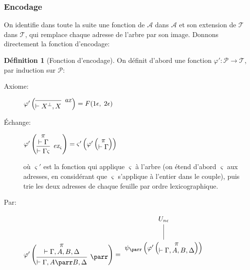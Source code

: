 \documentclass[11pt,a4paper]{article}
\theoremstyle{plain}
\theoremstyle{definition}
\newtheorem{definition}{Définition}
\theoremstyle{remark}
\newcommand*{\orth}{^\perp}
\newcommand*{\namedproofv}[2]{\hypo{#1}\infer[no rule]{1}{\vdash #2}}
\newcommand*{\axv}[1]{\infer{0}[\ensuremath{\mathit{ax}}]{\vdash #1}}
\newcommand*{\parrv}[1]{\infer{1}[\ensuremath{\parr}]{\vdash #1}}
\newcommand*{\permv}[2]{\infer{1}[\ensuremath{\textit{ex}_{#1}}]{\vdash #2}}
\newcommand*{\permapp}[2]{#2 #1}
\newcommand*{\someperm}{\varsigma}
\newcommand*{\sequent}{\Gamma}
\newcommand*{\sequentbis}{\Delta}
\newcommand*{\proofs}{\ensuremath{\mathcal{P}}}
\newcommand*{\addresses}{\ensuremath{\mathcal{A}}}
\newcommand*{\trees}{\ensuremath{\mathcal{T}}}
\newcommand*{\encode}{\ensuremath{\varphi}}
\begin{document}
\subsubsection{Encodage}

On identifie dans toute la suite une fonction de $\addresses$ dans $\addresses$ et son extension de $\trees$ dans $\trees$, qui remplace chaque adresse de l'arbre par son image. Donnons directement la fonction d'encodage:

\begin{definition}[Fonction d'encodage]
  On définit d'abord une fonction $\encode' : \proofs \rightarrow \trees$, par induction sur $\proofs$:
    \begin{description}
    \item[Axiome:]
    $\encode' \left(
    \begin{prooftree}
        \axv{{X}\orth, X}
    \end{prooftree}
    \right) = F(1 \epsilon, \; 2 \epsilon)$

    \item[Échange:]
    $\encode' \left(
    \begin{prooftree}
      \namedproofv{\pi}{\sequent}
      \permv{\someperm}{\permapp{\someperm}{\sequent}}
    \end{prooftree}
    \right) = \someperm' \left( \encode ' \left(
           \begin{prooftree}
             \namedproofv{\pi}{\sequent}
           \end{prooftree} \right) \right)$
           
    où $\someperm'$ est la fonction qui applique $\someperm$ à l'arbre (on étend d'abord $\someperm$ aux adresses, en considérant que $\someperm$ s'applique à l'entier dans le couple), puis trie les deux adresses de chaque feuille par ordre lexicographique.

    \item[Par:]
    $\encode' \left(
    \begin{prooftree}
      \namedproofv{\pi}{\sequent, A, B, \sequentbis}
      \parrv{\sequent, A \parr B, \sequentbis}
    \end{prooftree}
    \right) = \begin{tikzpicture}%
    [level 2/.style={sibling distance=3.5cm}]
    \node {$U_{n \epsilon}$}
        child {node {$\psi_\parr \left( \encode' \left(
           \begin{prooftree}
             \namedproofv{\pi}{\sequent, A, B, \sequentbis}
           \end{prooftree} \right) \right)$}
    };
    \end{tikzpicture}$
    

\end{description}
\end{definition}
\end{document}
